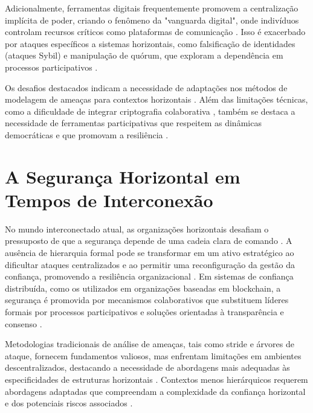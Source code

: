 Adicionalmente, ferramentas digitais frequentemente promovem a centralização
implícita de poder, criando o fenômeno da "vanguarda digital", onde indivíduos
controlam recursos críticos como plataformas de comunicação
\cite{SocialMediaTeamsAsDigitalVanguards}. Isso é exacerbado por ataques
específicos a sistemas horizontais, como falsificação de identidades (ataques
Sybil) e manipulação de quórum, que exploram a dependência em processos
participativos \cite{MitigationSybilAttack, TheSybilAttack}.

Os desafios destacados indicam a necessidade de adaptações nos métodos de
modelagem de ameaças para contextos horizontais \cite{Colbac}. Além das
limitações técnicas, como a dificuldade de integrar criptografia colaborativa
\cite{AbcCrypto}, também se destaca a necessidade de ferramentas participativas
que respeitem as dinâmicas democráticas e que promovam a resiliência
\cite{SecurityCardsToolkit}. 

\section{A Segurança Horizontal em Tempos de Interconexão}
\label{sec:desafios_contemporaneos}

No mundo interconectado atual, as organizações horizontais desafiam o
pressuposto de que a segurança depende de uma cadeia clara de comando
\cite{Non-HierarchicalForms, EverydayRevolutions}.
A ausência de hierarquia formal pode se transformar em um ativo estratégico
ao dificultar ataques centralizados e ao permitir uma reconfiguração da
gestão da confiança, promovendo a resiliência organizacional
\cite{EverydayRevolutions, Colbac}. Em sistemas de confiança distribuída,
como os utilizados em organizações baseadas em blockchain,
a segurança é promovida por mecanismos colaborativos que
substituem líderes formais por processos participativos e soluções
orientadas à transparência e consenso \cite{Reputation-basedDAO, AbcCrypto}.

Metodologias tradicionais de análise de ameaças, tais como \gls{stride} e árvores
de ataque, fornecem fundamentos valiosos, mas enfrentam limitações em
ambientes descentralizados, destacando a necessidade de abordagens mais
adequadas às especificidades de estruturas horizontais
\cite{ThreatModellingSurvey, ThreatModelingASummaryOfAvailableMethods}.
Contextos menos hierárquicos requerem abordagens adaptadas
que compreendam a complexidade da confiança horizontal
e dos potenciais riscos associados \cite{Colbac}.

